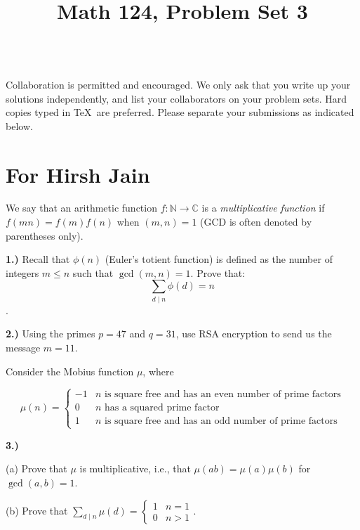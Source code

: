 \documentclass[10pt]{amsart}
\title{Math 124, Problem Set 3}
\begin{document}
\maketitle

\\
 Collaboration is permitted and encouraged. We only ask that you write up your solutions independently, and list your collaborators on your problem sets. Hard copies typed in \TeX\  are preferred. Please separate your submissions as indicated below.

\section*{For Hirsh Jain}

\noindent We say that an arithmetic function $f: \mathbb{N} \to \mathbb{C}$ is a \emph{multiplicative function} if $f(mn) = f(m) f(n)$ when $(m,n) = 1$ (GCD is often denoted by parentheses only).

\medskip

{\bf 1.)} Recall that $\phi(n)$ (Euler's totient function) is defined as the number of integers $m \leq n$ such that $\gcd(m,n) = 1$. Prove that: $$\sum_{d\mid n} \phi(d) = n$$.

\medskip

{\bf 2.)} Using the primes $p = 47$ and $q = 31$, use RSA encryption to send us the message $m = 11$. 

\medskip

\noindent Consider the Mobius function $\mu$, where 

$$\mu(n) = \begin{cases} -1 & n\text{ is square free and has an even number of prime factors} \\ 0 & n\text{ has a squared prime factor} \\ 1 & n \text{ is square free and has an odd number of prime factors} \end{cases}$$
\medskip

{\bf 3.)} 

\smallskip

(a) Prove that $\mu$ is multiplicative, i.e., that $\mu(ab) = \mu(a)\mu(b)$ for $\gcd(a,b) = 1$.

\smallskip

(b) Prove that $\sum_{d \mid n} \mu(d) = \begin{cases} 1 & n = 1 \\ 0 & n > 1 \end{cases}$. 
\end{document}

